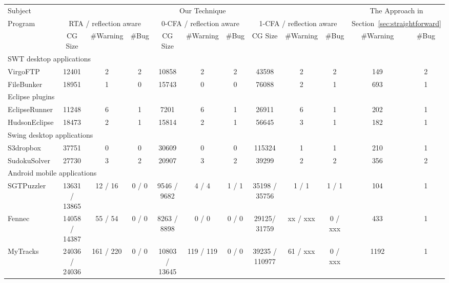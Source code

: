 \begin{table*}[ht]
\begin{center}
 \fontsize{9pt}{\baselineskip}\selectfont
\hspace*{-0.2cm}
\setlength{\tabcolsep}{.45\tabcolsep}
\begin{tabular}{|l||c|c|c||c|c|c||c|c|c||c|c|}
\hline
 Subject&  \multicolumn{9}{|c||}{Our Technique} & \multicolumn{2}{|c|}{The Approach in}  \\
\cline{2-10}
 Program  &  \multicolumn{3}{|c|}{RTA / reflection aware}& \multicolumn{3}{|c|}{0-CFA / reflection aware} & \multicolumn{3}{|c||}{1-CFA / reflection aware} & \multicolumn{2}{|c|}{Section~\ref{sec:straightforward}}  \\
\cline{2-12}
 & CG Size & \#Warning & \#Bug & CG Size & \#Warning & \#Bug & CG Size & \#Warning & \#Bug & \#Warning & \#Bug\\
\hline \hline
\multicolumn{12}{|l|}{SWT desktop applications}   \\
 \hline
 VirgoFTP&  12401 &  2 &  2 & 10858 & 2 & 2 & 43598 & 2 & 2& 149 & 2 \\
 \hline
 FileBunker &  18951 &  1 &  0 & 15743 & 0 & 0 & 76088 & 2 & 1& 693 & 1 \\
 \hline
 \hline
\multicolumn{12}{|l|}{Eclipse plugins}   \\
 \hline
 EclipseRunner&  11248&  6 &  1 & 7201 & 6 & 1 & 26911 & 6 & 1& 202 & 1 \\
 \hline
 HudsonEclipse& 18473 &  2 &  1 & 15814 & 2 & 1& 56645 & 3 & 1 & 182 & 1 \\
 \hline
 \hline
\multicolumn{12}{|l|}{Swing desktop applications}   \\
 \hline
 S3dropbox & 37751 &  0 &  0 & 30609 & 0 & 0 & 115324 & 1 & 1 & 210 & 1 \\
 \hline
  SudokuSolver&  27730&  3 &  2 & 20907 & 3 & 2 & 39299 & 2 & 2 & 356 & 2 \\
 \hline
 \hline
\multicolumn{12}{|l|}{Android mobile applications}   \\
 \hline
 SGTPuzzler & 13631 / 13865&  12 / 16 &  0 / 0 & 9546 / 9682& 4 / 4& 1 / 1 & 35198 / 35756 & 1 / 1  & 1 / 1& 104 & 1 \\
 \hline
 Fennec & 14058 / 14387 &  55 / 54 &  0 / 0 & 8263 / 8898 & 0 / 0 & 0 / 0& 29125/ 31759 & xx / xxx & 0 / xxx& 433 & 1 \\
 \hline
 MyTracks & 24036 / 24036 &  161 / 220 & 0 / 0 & 10803 / 13645 & 119 / 119 & 0 / 0 & 39235 / 110977 & 61 / xxx & 0 / xxx& 1192 & 1 \\

\end{tabular}
\end{center}
\end{table*}
